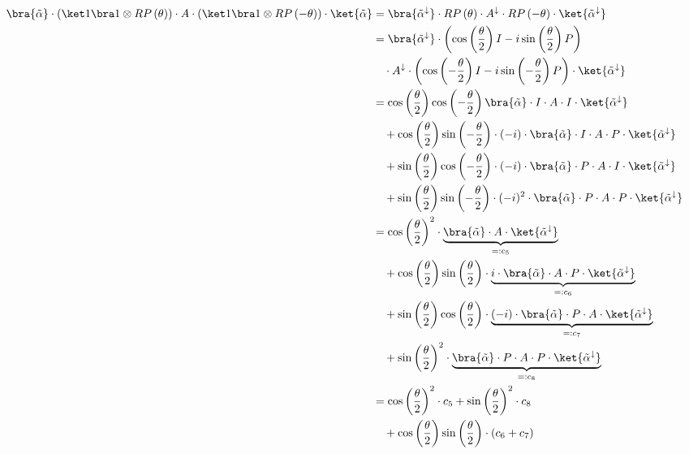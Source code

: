 \begin{equation}
    \label{eq:single-prob-simplification3}
    \begin{split}
        \bra{\tilde\alpha} \cdot (\ket 1 \bra 1 \otimes RP\left(\theta\right)) \cdot A \cdot (\ket 1 \bra 1 \otimes RP\left(-\theta\right)) \cdot \ket{\tilde\alpha}
            &= \bra{\tilde\alpha^\downarrow} \cdot RP\left(\theta\right) \cdot A^\downarrow \cdot RP\left(-\theta\right) \cdot \ket{\tilde\alpha^\downarrow} \\
            &= \bra{\tilde\alpha^\downarrow} \cdot \left(\cos\left(\frac\theta2\right) I - i \sin\left(\frac\theta2\right) P\right) \\
                &\quad\cdot A^\downarrow \cdot \left(\cos\left(-\frac\theta2\right) I - i \sin\left(-\frac\theta2\right) P\right) \cdot \ket{\tilde\alpha^\downarrow} \\
            &= \cos\left(\frac\theta2\right)\cos\left(-\frac\theta2\right) \bra{\tilde\alpha} \cdot I \cdot A \cdot I \cdot \ket{\tilde\alpha^\downarrow} \\
                &\quad + \cos\left(\frac\theta2\right)\sin\left(-\frac\theta2\right) \cdot (-i) \cdot \bra{\tilde\alpha} \cdot I \cdot A \cdot P \cdot \ket{\tilde\alpha^\downarrow}  \\
                &\quad + \sin\left(\frac\theta2\right)\cos\left(-\frac\theta2\right) \cdot (-i) \cdot \bra{\tilde\alpha} \cdot P \cdot A \cdot I \cdot \ket{\tilde\alpha^\downarrow} \\
                &\quad + \sin\left(\frac\theta2\right)\sin\left(-\frac\theta2\right) \cdot (-i)^2 \cdot \bra{\tilde\alpha} \cdot P \cdot A \cdot P \cdot \ket{\tilde\alpha^\downarrow} \\
            &= \cos\left(\frac\theta2\right)^2 \cdot \underbrace{\bra{\tilde\alpha} \cdot A \cdot \ket{\tilde\alpha^\downarrow}}_{=: c_5} \\
                &\quad + \cos\left(\frac\theta2\right)\sin\left(\frac\theta2\right) \cdot \underbrace{i \cdot \bra{\tilde\alpha} \cdot A \cdot P \cdot \ket{\tilde\alpha^\downarrow}}_{=: c_6} \\
                &\quad + \sin\left(\frac\theta2\right)\cos\left(\frac\theta2\right) \cdot \underbrace{(-i) \cdot \bra{\tilde\alpha} \cdot P \cdot A \cdot \ket{\tilde\alpha^\downarrow}}_{=: c_7} \\
                &\quad + \sin\left(\frac\theta2\right)^2 \cdot \underbrace{\bra{\tilde\alpha} \cdot P \cdot A \cdot P \cdot \ket{\tilde\alpha^\downarrow}}_{=: c_8} \\
            &= \cos\left(\frac\theta2\right)^2 \cdot c_5 + \sin\left(\frac\theta2\right)^2 \cdot c_8 \\
                &\quad + \cos\left(\frac\theta2\right)\sin\left(\frac\theta2\right) \cdot \left(c_6 + c_7\right)
    \end{split}
\end{equation}

